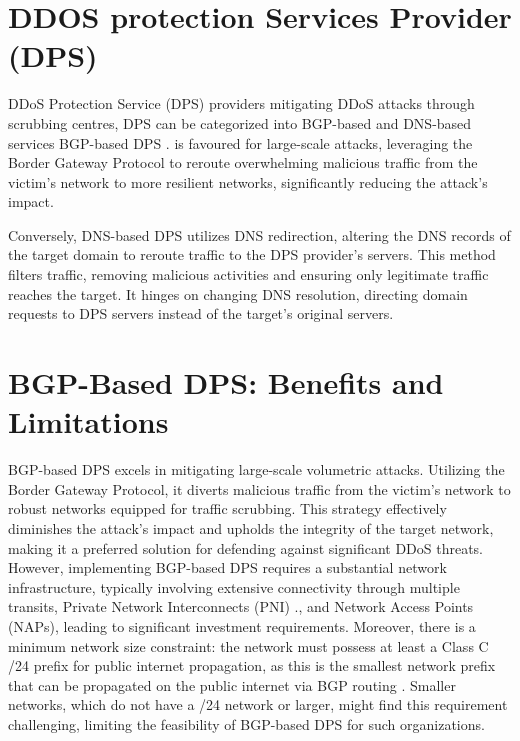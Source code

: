 \section{DDOS protection Services Provider (DPS)}\label{sec:DPS}
DDoS Protection Service (DPS) providers mitigating DDoS attacks through scrubbing centres, DPS can be categorized into BGP-based and DNS-based services BGP-based DPS \cite{tung2018understanding}. is favoured for large-scale attacks, leveraging the Border Gateway Protocol to reroute overwhelming malicious traffic from the victim's network to more resilient networks, significantly reducing the attack's impact.

Conversely, DNS-based DPS utilizes DNS redirection, altering the DNS records of the target domain to reroute traffic to the DPS provider’s servers. This method filters traffic, removing malicious activities and ensuring only legitimate traffic reaches the target. It hinges on changing DNS resolution, directing domain requests to DPS servers instead of the target's original servers.

\section{BGP-Based DPS: Benefits and Limitations}\label{sec:BDPS_benefits}
BGP-based DPS excels in mitigating large-scale volumetric attacks. Utilizing the Border Gateway Protocol, it diverts malicious traffic from the victim's network to robust networks equipped for traffic scrubbing. This strategy effectively diminishes the attack's impact and upholds the integrity of the target network, making it a preferred solution for defending against significant DDoS threats. However, implementing BGP-based DPS requires a substantial network infrastructure, typically involving extensive connectivity through multiple transits, Private Network Interconnects (PNI) \cite{chatzis2013there}., and Network Access Points (NAPs), leading to significant investment requirements. Moreover, there is a minimum network size constraint: the network must possess at least a Class C /24 prefix for public internet propagation, as this is the smallest network prefix that can be propagated on the public internet via BGP routing \cite{caesar2005bgp}. Smaller networks, which do not have a /24 network or larger, might find this requirement challenging, limiting the feasibility of BGP-based DPS for such organizations.

